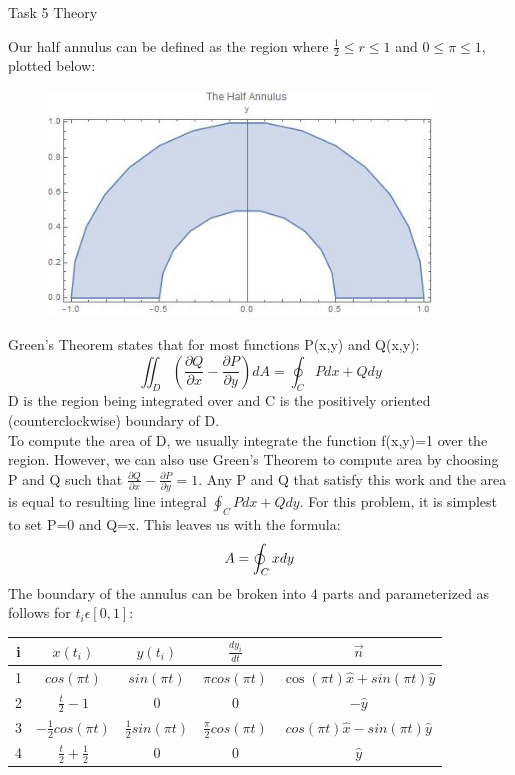 \documentclass{article}
\begin{document}
\begin{center}
\LARGE{Task 5 Theory}
\end{center}
\mbox{}

Our half annulus can be defined as the region where $\frac{1}{2}\leq r\leq 1$ and $0\leq\pi\leq 1$, plotted below:
\begin{figure}[H]
	\centering
	\includegraphics[width=4in]{HPC_HW_5_Annulus}
\end{figure}
Green's Theorem states that for most functions P(x,y) and Q(x,y):
\begin{equation*}
\iint_{D}(\frac{\partial Q}{\partial x}-\frac{\partial P}{\partial y})dA=\oint_{C}Pdx+Qdy
\end{equation*}
D is the region being integrated over and C is the positively oriented (counterclockwise) boundary of D.\\
To compute the area of D, we usually integrate the function f(x,y)=1 over the region. However, we can also use Green's Theorem to compute area by choosing P and Q such that $\frac{\partial Q}{\partial x}-\frac{\partial P}{\partial y}=1$. Any P and Q that satisfy this work and the area is equal to resulting line integral $\oint_{C}Pdx+Qdy$. For this problem, it is simplest to set P=0 and Q=x. This leaves us with the formula:
\begin{equation*}
A=\oint_{C}x\space dy
\end{equation*}
The boundary of the annulus can be broken into 4 parts and parameterized as follows for $t_i\epsilon[0,1]$:\\
\begin{center}
	\begin{tabular}{|c|c|c|c|c|}
    	\hline
		i & $x(t_i)$ & $y(t_i)$ & $\frac{dy_i}{dt}$ & $\vec{n}$ \\
        \hline
        1 & $cos(\pi t)$ & $sin(\pi t)$ & $\pi cos(\pi t)$ & $\cos(\pi t)\hat{x}+sin(\pi t)\hat{y}$ \\
        \hline
        2 & $\frac{t}{2}-1$ & 0 & 0 & $-\hat{y}$ \\
        \hline
        3 & $-\frac{1}{2}cos(\pi t)$ & $\frac{1}{2}sin(\pi t)$ & $\frac{\pi}{2} cos(\pi t)$ & $cos(\pi t)\hat{x}-sin(\pi t)\hat{y}$ \\
        \hline
        4 & $\frac{t}{2}+\frac{1}{2}$ & 0 & 0 & $\hat{y}$ \\
        \hline
    \end{tabular}
\end{center}
\end{document}
